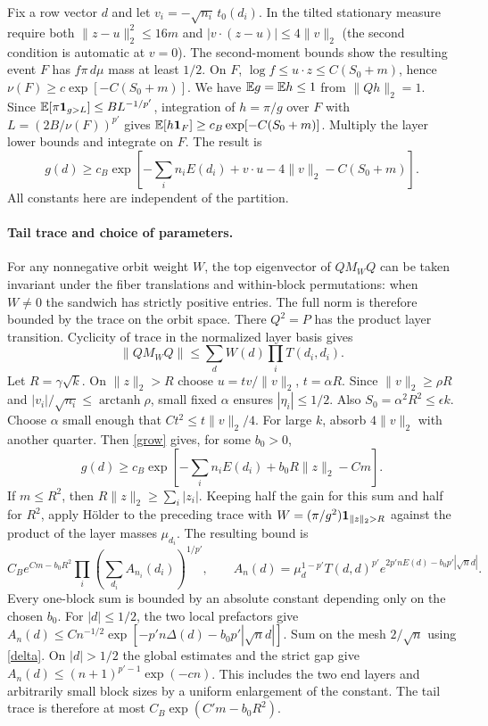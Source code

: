 Fix a row vector $d$ and let $v_i=-\sqrt{n_i}\,t_0(d_i)$. In the tilted stationary measure require both $\|z-u\|_2^2\le16m$ and $|v\cdot(z-u)|\le4\|v\|_2$ (the second condition is automatic at $v=0$). The second-moment bounds show the resulting event $F$ has $f\pi\,d\mu$ mass at least $1/2$. On $F$, $\log f\le u\cdot z\le C(S_0+m)$, hence $\nu(F)\ge c\exp[-C(S_0+m)]$. We have $\mathbb E g=\mathbb E h\le1$ from $\|Qh\|_2=1$. Since $\mathbb E[\pi\mathbf 1_{g>L}]\le B L^{-1/p'}$, integration of $h=\pi/g$ over $F$ with $L=(2B/\nu(F))^{p'}$ gives $\mathbb E[h\mathbf 1_F]\ge c_B\exp[-C(S_0+m)]$. Multiply the layer lower bounds and integrate on $F$. The result is
\begin{equation}\label{grow}
 g(d)\ge c_B\exp\!\left[-\sum_i n_iE(d_i)+v\cdot u
           -4\|v\|_2-C(S_0+m)\right].
\end{equation}
All constants here are independent of the partition.

\paragraph{Tail trace and choice of parameters.}
For any nonnegative orbit weight $W$, the top eigenvector of $QM_WQ$ can be taken invariant under the fiber translations and within-block permutations: when $W\ne0$ the sandwich has strictly positive entries. The full norm is therefore bounded by the trace on the orbit space. There $Q^2=P$ has the product layer transition. Cyclicity of trace in the normalized layer basis gives
\[
 \|QM_WQ\|\le\sum_d W(d)\prod_i T(d_i,d_i).
\]
Let $R=\gamma\sqrt{k}$. On $\|z\|_2>R$ choose $u=t v/\|v\|_2$, $t=\alpha R$. Since $\|v\|_2\ge\rho R$ and $|v_i|/\sqrt{n_i}\le\operatorname{arctanh}\rho$, small fixed $\alpha$ ensures $|\eta_i|\le1/2$. Also $S_0=\alpha^2R^2\le\epsilon k$. Choose $\alpha$ small enough that $C t^2\le t\|v\|_2/4$. For large $k$, absorb $4\|v\|_2$ with another quarter. Then \eqref{grow} gives, for some $b_0>0$,
\[
 g(d)\ge c_B\exp[-\textstyle\sum_i n_iE(d_i)+b_0R\|z\|_2-Cm].
\]
If $m\le R^2$, then $R\|z\|_2\ge\sum_i|z_i|$. Keeping half the gain for this sum and half for $R^2$, apply H\"older to the preceding trace with $W=(\pi/g^2)\mathbf 1_{\|z\|_2>R}$ against the product of the layer masses $\mu_{d_i}$. The resulting bound is
\[
 C_B e^{Cm-b_0R^2}\prod_i
 \left(\sum_{d_i} A_{n_i}(d_i)\right)^{1/p'},\qquad
 A_n(d)=\mu_d^{1-p'}T(d,d)^{p'}e^{2p'nE(d)-b_0p'|\sqrt n d|}.
\]
Every one-block sum is bounded by an absolute constant depending only on the chosen $b_0$. For $|d|\le1/2$, the two local prefactors give $A_n(d)\le Cn^{-1/2}\exp[-p'n\Delta(d)-b_0p'|\sqrt n d|]$. Sum on the mesh $2/\sqrt n$ using \eqref{delta}. On $|d|>1/2$ the global estimates and the strict gap give $A_n(d)\le(n+1)^{p'-1}\exp(-cn)$. This includes the two end layers and arbitrarily small block sizes by a uniform enlargement of the constant. The tail trace is therefore at most $C_B\exp(C'm-b_0R^2)$.

